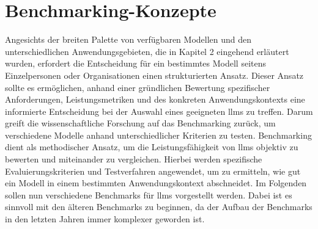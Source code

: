 \section{Benchmarking-Konzepte}
Angesichts der breiten Palette von verfügbaren Modellen und den unterschiedlichen Anwendungsgebieten, die in Kapitel 2 eingehend erläutert wurden, erfordert die Entscheidung für ein bestimmtes Modell seitens Einzelpersonen oder Organisationen einen strukturierten Ansatz.
Dieser Ansatz sollte es ermöglichen, anhand einer gründlichen Bewertung spezifischer Anforderungen, Leistungsmetriken und des konkreten Anwendungskontexts eine informierte Entscheidung bei der Auswahl eines geeigneten \acp{llm} zu treffen.
Darum greift die wissenschaftliche Forschung auf das Benchmarking zurück, um verschiedene Modelle anhand unterschiedlicher Kriterien zu testen.
Benchmarking dient als methodischer Ansatz, um die Leistungsfähigkeit von \acp{llm} objektiv zu bewerten und miteinander zu vergleichen.
Hierbei werden spezifische Evaluierungskriterien und Testverfahren angewendet, um zu ermitteln, wie gut ein Modell in einem bestimmten Anwendungskontext abschneidet.
Im Folgenden sollen nun verschiedene Benchmarks für \acp{llm} vorgestellt werden.
Dabei ist es sinnvoll mit den älteren Benchmarks zu beginnen, da der Aufbau der Benchmarks in den letzten Jahren immer komplexer geworden ist.

